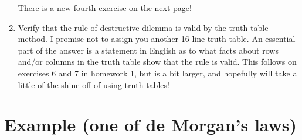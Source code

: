 \documentclass[12pt]{article}
\begin{document}
\begin{enumerate}
There is a new fourth exercise on the next page!

\item  Verify that the rule of destructive dilemma is valid by the truth table method.  I promise not to assign you another 16 line truth table.  An essential part of the answer is a statement in English as to what facts about
rows and/or columns in the truth table show that the rule is valid.   This follows on exercises 6 and 7 in homework 1, but is a bit larger, and hopefully will take a little of the shine off of using truth tables!

\end{enumerate}


\section{Example (one of de Morgan's laws)}
\end{document}
